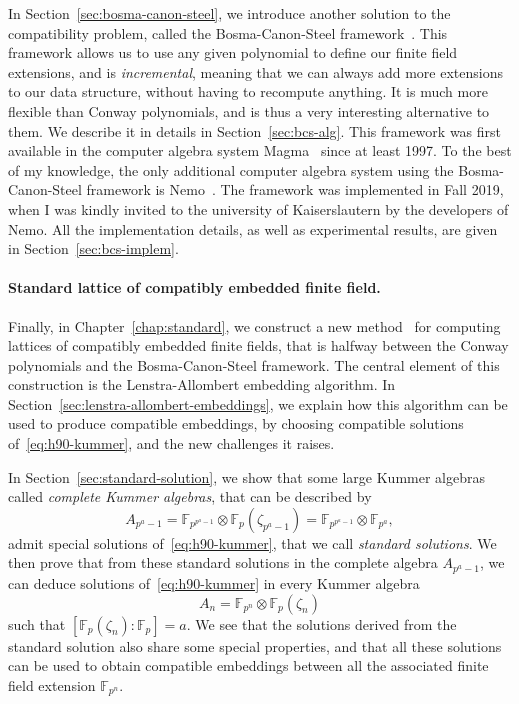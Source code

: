 In Section~\ref{sec:bosma-canon-steel}, we introduce another solution to the
compatibility problem, called the Bosma-Canon-Steel framework~\cite{BCS97}.
This framework allows us to use any given polynomial to define our finite field
extensions, and is \emph{incremental}, meaning that we can always add more
extensions to our data structure, without having to recompute anything. It is
much more flexible than Conway polynomials, and is thus a very interesting
alternative to them. We describe it in details in Section~\ref{sec:bcs-alg}.
This framework was first available in the computer algebra system
Magma~\cite{Magma} since at least 1997. To the best of my knowledge, the only
additional computer algebra system using the Bosma-Canon-Steel framework is
Nemo~\cite{Nemo}. The framework was implemented in Fall 2019, when I was kindly
invited to the university of Kaiserslautern by the developers of Nemo. All the
implementation details, as well as experimental results, are given in
Section~\ref{sec:bcs-implem}.

\paragraph{Standard lattice of compatibly embedded finite field.}
Finally, in Chapter~\ref{chap:standard}, we construct a new method~\cite{DRR19}
for computing lattices of compatibly embedded finite fields, that is halfway
between the Conway polynomials and the Bosma-Canon-Steel framework. The central
element of this construction is the Lenstra-Allombert embedding algorithm. In
Section~\ref{sec:lenstra-allombert-embeddings}, we explain how this algorithm
can be used to produce compatible embeddings, by choosing compatible solutions
of~\eqref{eq:h90-kummer}, and the new challenges it raises.

In Section~\ref{sec:standard-solution}, we show that some large Kummer algebras
called \emph{complete Kummer algebras}, that can be described by
\[
  A_{p^a-1} = \mathbb{F}_{p^{p^a-1}}\otimes\mathbb{F}_{p}(\zeta_{p^a-1})
  = \mathbb{F}_{p^{p^a-1}}\otimes \mathbb{F}_{p^a},
\]
admit special solutions of~\eqref{eq:h90-kummer}, that we call \emph{standard
solutions}. We then prove that from these standard solutions in the complete
algebra $A_{p^a-1}$, we can deduce solutions of~\eqref{eq:h90-kummer} in every
Kummer algebra
\[
  A_n = \mathbb{F}_{p^n}\otimes \mathbb{F}_{p}(\zeta_n)
\]
such that $\left[ \mathbb{F}_{p}(\zeta_n):\mathbb{F}_p \right]=a$. We see that
the solutions derived from the standard solution also share some special
properties, and that all these solutions can be used to obtain
compatible embeddings between all the associated finite field extension
$\mathbb{F}_{p^n}$.

